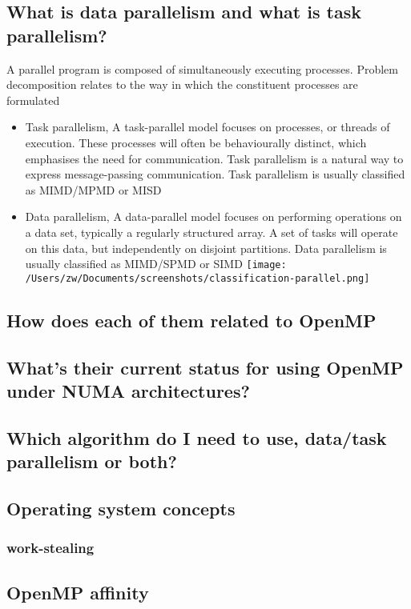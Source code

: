 \documentclass[11pt]{article}
\begin{document}
\subsection{What is data parallelism and what is task parallelism?}
\label{sec-9-1}
A parallel program is composed of simultaneously executing processes. Problem decomposition relates to the way in which the constituent processes are formulated
\begin{itemize}
\item Task parallelism, A task-parallel model focuses on processes, or threads of execution. These processes will often be behaviourally distinct, which emphasises the need for communication. Task parallelism is a natural way to express message-passing communication. 
Task parallelism is usually classified as MIMD/MPMD or MISD
\item Data parallelism, A data-parallel model focuses on performing operations on a data set, typically a regularly structured array. A set of tasks will operate on this data, but independently on disjoint partitions.
Data parallelism is usually classified as MIMD/SPMD or SIMD
\texttt{[image: /Users/zw/Documents/screenshots/classification-parallel.png]}
\end{itemize}

\subsection{How does each of them related to OpenMP}
\label{sec-9-2}
\subsection{What's their current status for using OpenMP under NUMA architectures?}
\label{sec-9-3}
\subsection{Which algorithm do I need to use, data/task parallelism or both?}
\label{sec-9-4}
\subsection{Operating system concepts}
\label{sec-9-5}
\subsubsection{work-stealing \cite{blumofe99_sched_multit_comput_by_work_steal}}
\label{sec-9-5-1}
\subsection{OpenMP affinity}
\label{sec-9-6}
\end{document}
